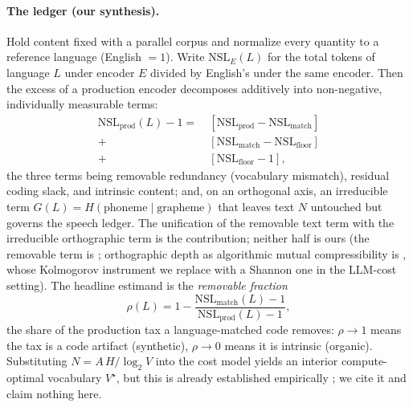 \documentclass[11pt]{article}
\begin{document}
\paragraph{The ledger (our synthesis).} Hold content fixed with a parallel corpus and normalize every
quantity to a reference language (English $=1$). Write $\mathrm{NSL}_E(L)$ for the total tokens of
language $L$ under encoder $E$ divided by English's under the same encoder. Then the excess of a
production encoder decomposes additively into non-negative, individually measurable terms:
\begin{equation}\label{eq:ledger}
\begin{split}
\mathrm{NSL}_{\mathrm{prod}}(L)-1
=\ &[\mathrm{NSL}_{\mathrm{prod}}-\mathrm{NSL}_{\mathrm{match}}]\\
+\ &[\mathrm{NSL}_{\mathrm{match}}-\mathrm{NSL}_{\mathrm{floor}}]\\
+\ &[\mathrm{NSL}_{\mathrm{floor}}-1],
\end{split}
\end{equation}
the three terms being removable redundancy (vocabulary mismatch), residual coding slack, and intrinsic
content; and, on an orthogonal axis, an irreducible term $G(L)=H(\text{phoneme}\mid\text{grapheme})$
that leaves text $N$ untouched but governs the speech ledger. The unification of the removable text term
with the irreducible orthographic term is the contribution; neither half is ours (the removable term is
\citealp{erdogan2026infotok}; orthographic depth as algorithmic mutual compressibility is
\citealp{torres2025orthography}, whose Kolmogorov instrument we replace with a Shannon one in the
LLM-cost setting). The headline estimand is the \emph{removable fraction}
\begin{equation}\label{eq:rho}
\rho(L)=1-\frac{\mathrm{NSL}_{\mathrm{match}}(L)-1}{\mathrm{NSL}_{\mathrm{prod}}(L)-1},
\end{equation}
the share of the production tax a language-matched code removes: $\rho\!\to\!1$ means the tax is a code
artifact (synthetic), $\rho\!\to\!0$ means it is intrinsic (organic). Substituting
$N=A\,H/\log_2 V$ into the cost model yields an interior compute-optimal vocabulary $V^\star$, but this
is already established empirically \citep{tao2024vocabulary, limisiewicz2026compute}; we cite it and
claim nothing here.
\end{document}
